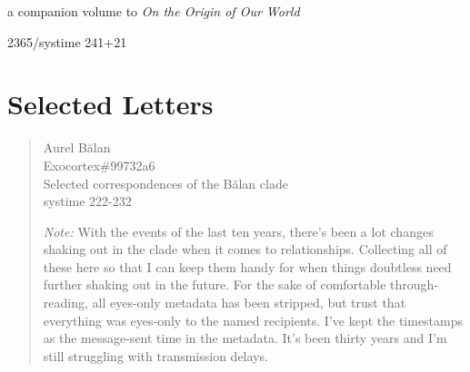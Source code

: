 \documentclass[11pt]{memoir}
\begin{document}
  a companion volume to \emph{On the Origin of Our World}

  2365/systime 241+21
  
  \vfill

  \part*{Selected Letters}

  \begin{quote}
    Aurel Bălan \\
    Exocortex\#99732a6 \\
    Selected correspondences of the Bălan clade \\
    systime 222-232
    
    \emph{Note:} With the events of the last ten years, there's been a lot changes shaking out in the clade when it comes to relationships. Collecting all of these here so that I can keep them handy for when things doubtless need further shaking out in the future. For the sake of comfortable through-reading, all eyes-only metadata has been stripped, but trust that everything was eyes-only to the named recipients. I've kept the timestamps as the message-sent time in the metadata. It's been thirty years and I'm still struggling with transmission delays.
  \end{quote}

  
  
  
  
  
  
  
  
  
  
  
  
  
  
  
  
  
  
  
  
  

  \backmatter

  \markboth{}{}

  

  
\end{document}
